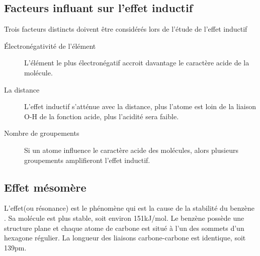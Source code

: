 \subsection{Facteurs influant sur l'effet inductif}
Trois facteurs distincts doivent être considérés lors de l'étude de l'effet inductif
\begin{description}
  \item[\'Electronégativité de l'élément]

    L'élément le plus électronégatif accroit davantage le caractère acide de la molécule.

  \item[La distance]

    L'effet inductif s'atténue avec la distance, plus l'atome est loin de la liaison O-H de la fonction acide, plus l'acidité sera faible.

  \item[Nombre de groupements]

    Si un atome influence le caractère acide des molécules, alors plusieurs groupements amplifieront l'effet inductif.
\end{description}


\subsection{Effet mésomère}
L'effet(ou résonance) est le phénomène qui est la cause de la stabilité du benzène .
Sa molécule est plus stable, soit environ 151kJ/mol.
Le benzène possède une structure plane et chaque atome de carbone est situé à l'un des sommets d'un hexagone régulier.
La longueur des liaisons carbone-carbone est identique, soit 139pm.

